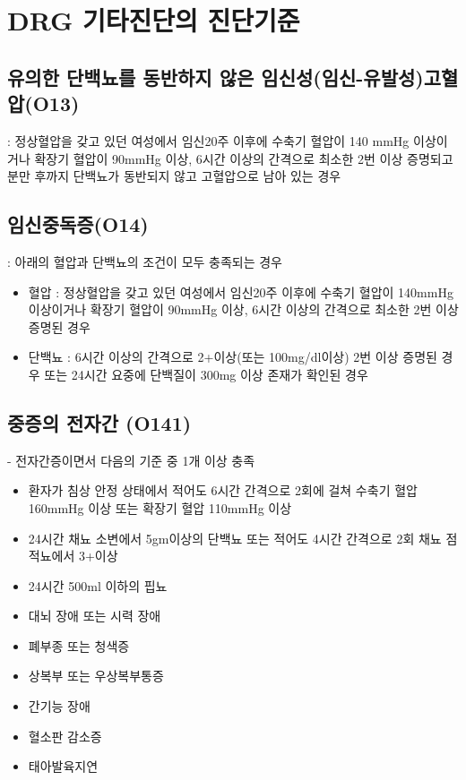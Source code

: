 \clearpage
\section{DRG 기타진단의 진단기준}
\subsection{유의한 단백뇨를 동반하지 않은 임신성(임신-유발성)고혈압(O13)}\label{SUPPIH}
 : 정상혈압을 갖고 있던 여성에서 임신20주 이후에 수축기 혈압이 140 mmHg 이상이거나 확장기 혈압이 90mmHg 이상, 6시간 이상의 간격으로 최소한 2번 이상 증명되고 분만 후까지 단백뇨가 동반되지 않고 고혈압으로 남아 있는 경우

\subsection*{임신중독증(O14)}\label{PIH}
 : 아래의 혈압과 단백뇨의 조건이 모두 충족되는 경우
\begin{itemize}\tightlist
\item 혈압 : 정상혈압을 갖고 있던 여성에서 임신20주 이후에 수축기 혈압이 140mmHg 이상이거나 확장기 혈압이 90mmHg 이상, 6시간 이상의 간격으로 최소한 2번 이상 증명된 경우
\item 단백뇨 : 6시간 이상의 간격으로 2+이상(또는 100mg/dl이상) 2번 이상 증명된 경우 또는 24시간 요중에 단백질이 300mg 이상 존재가 확인된 경우
\end{itemize}

\subsection*{중증의 전자간 (O141)}\label{severePIH}
 - 전자간증이면서 다음의 기준 중 1개 이상 충족
\begin{itemize}\tightlist
\item 환자가 침상 안정 상태에서 적어도 6시간 간격으로 2회에 걸쳐 수축기 혈압 160mmHg 이상 또는 확장기 혈압 110mmHg 이상
\item 24시간 채뇨 소변에서 5gm이상의 단백뇨 또는 적어도 4시간 간격으로 2회 채뇨 점적뇨에서 3+이상
\item 24시간 500ml 이하의 핍뇨
\item 대뇌 장애 또는 시력 장애
\item 폐부종 또는 청색증
\item 상복부 또는 우상복부통증
\item 간기능 장애
\item 혈소판 감소증
\item 태아발육지연
\end{itemize}


